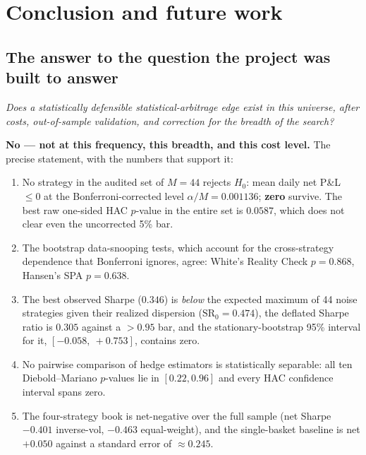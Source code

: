 \section{Conclusion and future work}
\label{ch:conclusion}

\subsection{The answer to the question the project was built to answer}

\emph{Does a statistically defensible statistical-arbitrage edge exist in this universe,
after costs, out-of-sample validation, and correction for the breadth of the search?}

\textbf{No --- not at this frequency, this breadth, and this cost level.} The precise
statement, with the numbers that support it:
\begin{enumerate}
  \item No strategy in the audited set of $M=44$ rejects $H_0$: mean daily net P\&L
    $\le0$ at the Bonferroni-corrected level $\alpha/M=0.001136$; \textbf{zero} survive.
    The best raw one-sided HAC $p$-value in the entire set is $0.0587$, which does not
    clear even the uncorrected 5\% bar.
  \item The bootstrap data-snooping tests, which account for the cross-strategy dependence
    that Bonferroni ignores, agree: White's Reality Check $p=0.868$, Hansen's SPA
    $p=0.638$.
  \item The best observed Sharpe ($0.346$) is \emph{below} the expected maximum of 44
    noise strategies given their realized dispersion ($\mathrm{SR}_0=0.474$), the deflated
    Sharpe ratio is $0.305$ against a $>0.95$ bar, and the stationary-bootstrap 95\%
    interval for it, $[-0.058,\ +0.753]$, contains zero.
  \item No pairwise comparison of hedge estimators is statistically separable: all ten
    Diebold--Mariano $p$-values lie in $[0.22,0.96]$ and every HAC confidence interval
    spans zero.
  \item The four-strategy book is net-negative over the full sample (net Sharpe $-0.401$
    inverse-vol, $-0.463$ equal-weight), and the single-basket baseline is net $+0.050$
    against a standard error of $\approx0.245$.
\end{enumerate}

